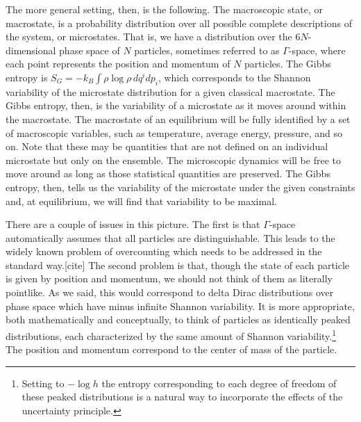\documentclass[prb, twocolumn]{revtex4-1}
\begin{document}
The more general setting, then, is the following. The macroscopic state, or macrostate, is a probability distribution over all possible complete descriptions of the system, or microstates. That is, we have a distribution over the $6N$-dimensional phase space of $N$ particles, sometimes referred to as $\Gamma$-space, where each point represents the position and momentum of $N$ particles. The Gibbs entropy is $S_G = -k_B \int \rho \log \rho \, dq^idp_i$, which corresponds to the Shannon variability of the microstate distribution for a given classical macrostate. The Gibbs entropy, then, is the variability of a microstate as it moves around within the macrostate. The macrostate of an equilibrium will be fully identified by a set of macroscopic variables, such as temperature, average energy, pressure, and so on. Note that these may be quantities that are not defined on an individual microstate but only on the ensemble. The microscopic dynamics will be free to move around as long as those statistical quantities are preserved. The Gibbs entropy, then, tells us the variability of the microstate under the given constraints and, at equilibrium, we will find that variability to be maximal.

There are a couple of issues in this picture. The first is that $\Gamma$-space automatically assumes that all particles are distinguishable. This leads to the widely known problem of overcounting which needs to be addressed in the standard way.[cite] The second problem is that, though the state of each particle is given by position and momentum, we should not think of them as literally pointlike. As we said, this would correspond to delta Dirac distributions over phase space which have minus infinite Shannon variability. It is more appropriate, both mathematically and conceptually, to think of particles as identically peaked distributions, each characterized by the same amount of Shannon variability.\footnote{Setting to $-\log h$ the entropy corresponding to each degree of freedom of these peaked distributions is a natural way to incorporate the effects of the uncertainty principle.} The position and momentum correspond to the center of mass of the particle.
\end{document}
